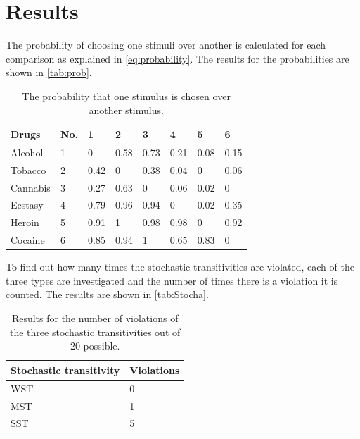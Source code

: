 \section*{Results}
\label{Results}
%
The probability of choosing one stimuli over another is calculated for each comparison as explained in \autoref{eq:probability}. The results for the probabilities are shown in \autoref{tab:prob}. 
%
\begin{table}[H]
\centering
\begin{tabular}{@{}llllllll@{}}
\toprule
Drugs      & No. & 1    & 2    & 3    & 4    & 5    & 6    \\ \midrule
Alcohol    & 1   & 0    & 0.58 & 0.73 & 0.21 & 0.08 & 0.15 \\
Tobacco    & 2   & 0.42 & 0    & 0.38 & 0.04 & 0    & 0.06 \\
Cannabis   & 3   & 0.27 & 0.63 & 0    & 0.06 & 0.02 & 0    \\
Ecstasy    & 4   & 0.79 & 0.96 & 0.94 & 0    & 0.02 & 0.35 \\
Heroin     & 5   & 0.91 & 1    & 0.98 & 0.98 & 0    & 0.92 \\
Cocaine    & 6   & 0.85 & 0.94 & 1    & 0.65 & 0.83 & 0    \\ \bottomrule
\end{tabular}
\caption{The probability that one stimulus is chosen over another stimulus.}
\label{tab:prob}
\end{table} 
\noindent 
%
To find out how many times the stochastic transitivities are violated, each of the three types are investigated and the number of times there is a violation it is counted. The results are shown in \autoref{tab:Stocha}. 
%
\begin{table}[H]
\centering
\begin{tabular}{@{}ll@{}}
\toprule
Stochastic transitivity     & Violations \\ \midrule
WST      & 0   \\
MST      & 1   \\
SST      & 5   \\ \bottomrule
\end{tabular}
\caption{Results for the number of violations of the three stochastic transitivities out of 20 possible.}
\label{tab:Stocha}
\end{table}
\vfill

